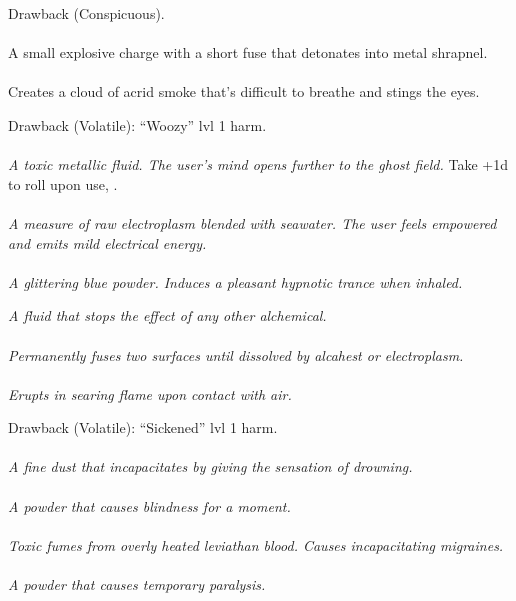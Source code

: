 \documentclass{article}
\begin{document}
\begin{multicols*}{3}
Drawback (Conspicuous).
\\\\
A small explosive charge with a short fuse that detonates into metal shrapnel.
\\\\
Creates a cloud of acrid smoke that's difficult to breathe and stings the eyes.


Drawback (Volatile): ``Woozy'' lvl 1 harm.
\\\\
\textit{A toxic metallic fluid.
The user's mind opens further to the ghost field.}
Take +1d to  roll upon use, .
\\\\
\textit{A measure of raw electroplasm blended with seawater.
The user feels empowered and emits mild electrical energy.}
\\\\
\textit{A glittering blue powder.
Induces a pleasant hypnotic trance when inhaled.}


\textit{A fluid that stops the effect of any other alchemical.}
\\\\
\textit{Permanently fuses two surfaces until dissolved by alcahest or electroplasm.}
\\\\
\textit{Erupts in searing flame upon contact with air.}


Drawback (Volatile): ``Sickened'' lvl 1 harm.
\\\\
\textit{A fine dust that incapacitates by giving the sensation of drowning.}
\\\\
\textit{A powder that causes blindness for a moment.}
\\\\
\textit{Toxic fumes from overly heated leviathan blood.
Causes incapacitating migraines.}
\\\\
\textit{A powder that causes temporary paralysis.}



\end{multicols*}
\end{document}
